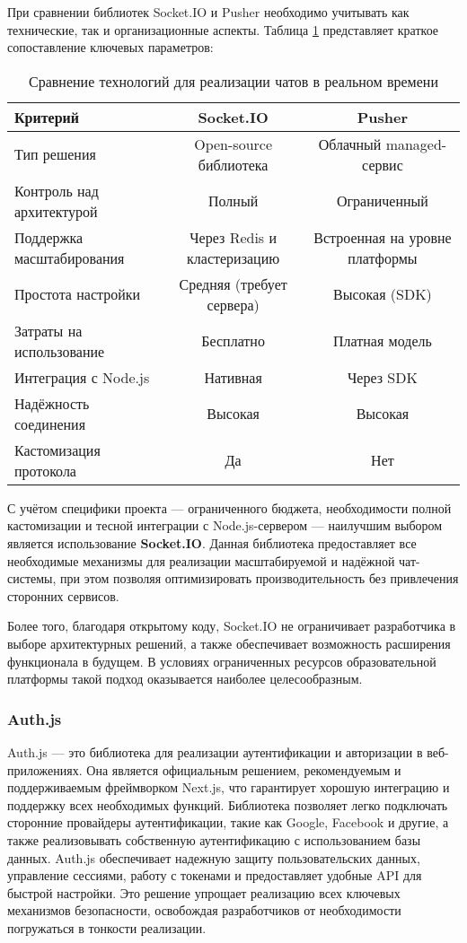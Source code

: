 При сравнении библиотек Socket.IO и Pusher необходимо учитывать как технические, так и организационные аспекты. Таблица \ref{tab:chat-comparison} представляет краткое сопоставление ключевых параметров:

\begin{table}[h]
\centering
\caption{Сравнение технологий для реализации чатов в реальном времени}
\small
\label{tab:chat-comparison}
\begin{tabular}{|l|c|c|}
\hline
\textbf{Критерий} & \textbf{Socket.IO} & \textbf{Pusher} \\ \hline
Тип решения & Open-source библиотека & Облачный managed-сервис \\ \hline
Контроль над архитектурой & Полный & Ограниченный \\ \hline
Поддержка масштабирования & Через Redis и кластеризацию & Встроенная на уровне платформы \\ \hline
Простота настройки & Средняя (требует сервера) & Высокая (SDK) \\ \hline
Затраты на использование & Бесплатно & Платная модель \\ \hline
Интеграция с Node.js & Нативная & Через SDK \\ \hline
Надёжность соединения & Высокая & Высокая \\ \hline
Кастомизация протокола & Да & Нет \\ \hline
\end{tabular}
\end{table}

С учётом специфики проекта --- ограниченного бюджета, необходимости полной кастомизации и тесной интеграции с Node.js-сервером --- наилучшим выбором является использование \textbf{Socket.IO}. Данная библиотека предоставляет все необходимые механизмы для реализации масштабируемой и надёжной чат-системы, при этом позволяя оптимизировать производительность без привлечения сторонних сервисов.

Более того, благодаря открытому коду, Socket.IO не ограничивает разработчика в выборе архитектурных решений, а также обеспечивает возможность расширения функционала в будущем. В условиях ограниченных ресурсов образовательной платформы такой подход оказывается наиболее целесообразным.

\subsubsection{Auth.js}
Auth.js --- это библиотека для реализации аутентификации и авторизации в веб-приложениях. Она является официальным решением, рекомендуемым и поддерживаемым фреймворком Next.js, что гарантирует хорошую интеграцию и поддержку всех необходимых функций. Библиотека позволяет легко подключать сторонние провайдеры аутентификации, такие как Google, Facebook и другие, а также реализовывать собственную аутентификацию с использованием базы данных. Auth.js обеспечивает надежную защиту пользовательских данных, управление сессиями, работу с токенами и предоставляет удобные API для быстрой настройки. Это решение упрощает реализацию всех ключевых механизмов безопасности, освобождая разработчиков от необходимости погружаться в тонкости реализации.

